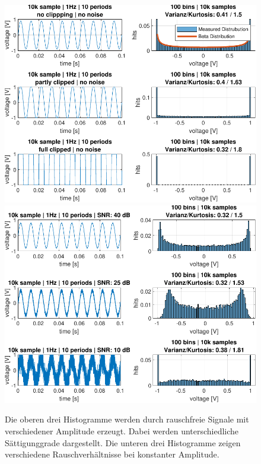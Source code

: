 \begin{figure}[h!] 
	\centering 
	\includegraphics[width=.9\columnwidth]{../img/beta-distribution.pdf}
	\includegraphics[width=.9\columnwidth]{../img/noise-histogramm.pdf}
	\caption{Die oberen drei Histogramme werden durch rauschfreie Signale mit verschiedener Amplitude erzeugt. Dabei werden unterschiedliche Sättigunggrade dargestellt. Die unteren drei Histogramme zeigen verschiedene Rauschverhältnisse bei konstanter Amplitude.}
	\label{fig:Histogramm-Gain}
\end{figure} 
